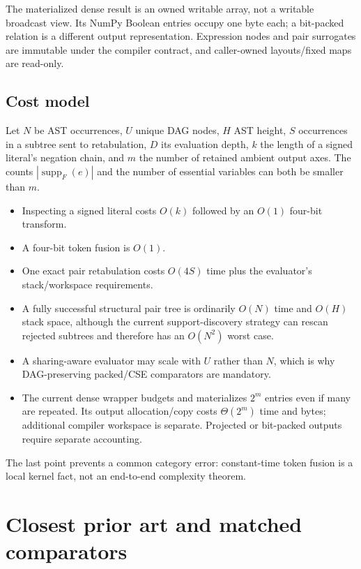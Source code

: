 \documentclass[10pt]{article}
\newcommand{\supp}{\operatorname{supp}}
\theoremstyle{plain}
\theoremstyle{definition}
\theoremstyle{remark}
\begin{document}
The materialized dense result is an owned writable array, not a writable broadcast view. Its NumPy Boolean entries occupy one byte each; a bit-packed relation is a different output representation. Expression nodes and pair surrogates are immutable under the compiler contract, and caller-owned layouts/fixed maps are read-only.

\subsection{Cost model}

Let $N$ be AST occurrences, $U$ unique DAG nodes, $H$ AST height, $S$ occurrences in a subtree sent to retabulation, $D$ its evaluation depth, $k$ the length of a signed literal's negation chain, and $m$ the number of retained ambient output axes. The counts $|\supp_F(e)|$ and the number of essential variables can both be smaller than $m$.

\begin{itemize}
 \item Inspecting a signed literal costs $O(k)$ followed by an $O(1)$ four-bit transform.
 \item A four-bit token fusion is $O(1)$.
 \item One exact pair retabulation costs $O(4S)$ time plus the evaluator's stack/workspace requirements.
 \item A fully successful structural pair tree is ordinarily $O(N)$ time and $O(H)$ stack space, although the current support-discovery strategy can rescan rejected subtrees and therefore has an $O(N^2)$ worst case.
 \item A sharing-aware evaluator may scale with $U$ rather than $N$, which is why DAG-preserving packed/CSE comparators are mandatory.
 \item The current dense wrapper budgets and materializes $2^m$ entries even if many are repeated. Its output allocation/copy costs $\Theta(2^m)$ time and bytes; additional compiler workspace is separate. Projected or bit-packed outputs require separate accounting.
\end{itemize}

The last point prevents a common category error: constant-time token fusion is a local kernel fact, not an end-to-end complexity theorem.

\section{Closest prior art and matched comparators}
\label{sec:related}
\end{document}
